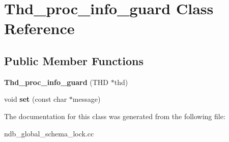\hypertarget{classThd__proc__info__guard}{}\section{Thd\+\_\+proc\+\_\+info\+\_\+guard Class Reference}
\label{classThd__proc__info__guard}
\subsection*{Public Member Functions}
\begin{DoxyCompactItemize}
\item 
\mbox{\label{classThd__proc__info__guard_aff1bbbea8aaf7089fcac84688ada42e9}} 
{\bfseries Thd\+\_\+proc\+\_\+info\+\_\+guard} (T\+HD $\ast$thd)
\item 
\mbox{\label{classThd__proc__info__guard_a2cea064aa18148241bfe3856b48d0c25}} 
void {\bfseries set} (const char $\ast$message)
\end{DoxyCompactItemize}


The documentation for this class was generated from the following file\+:\begin{DoxyCompactItemize}
\item 
ndb\+\_\+global\+\_\+schema\+\_\+lock.\+cc\end{DoxyCompactItemize}
